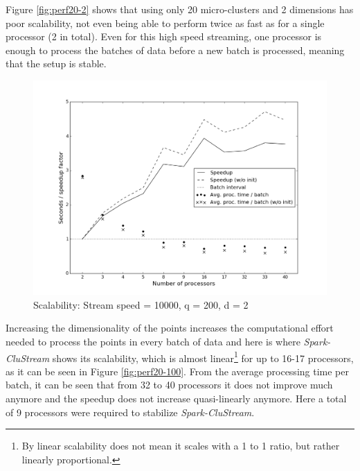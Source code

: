 \documentclass[10pt, conference, compsocconf]{IEEEtran}
\begin{document}
Figure \ref{fig:perf20-2} shows that using only 20 micro-clusters and 2 dimensions has poor scalability, not even being able to perform twice as fast as for a single processor (2 in total). Even for this high speed streaming, one processor is enough to process the batches of data before a new batch is processed, meaning that the setup is stable.

\begin{figure}[h!]
 \centering
 \includegraphics[scale=0.3]{./styles/perf200-2.png}
 \caption{Scalability: Stream speed = 10000, q = 200, d = 2}
 \label{fig:perf200-2}
\end{figure}

Increasing the dimensionality of the points increases the computational effort needed to process the points in every batch of data and here is where \textit{Spark-CluStream} shows its scalability, which is almost linear\footnote{By linear scalability does not mean it scales with a 1 to 1 ratio, but rather linearly proportional.} for up to 16-17 processors, as it can be seen in Figure \ref{fig:perf20-100}.  From the average processing time per batch, it can be seen that from 32 to 40 processors it does not improve much anymore and the speedup does not increase quasi-linearly anymore. Here a total of 9 processors were required to stabilize \textit{Spark-CluStream}. 
\end{document}
